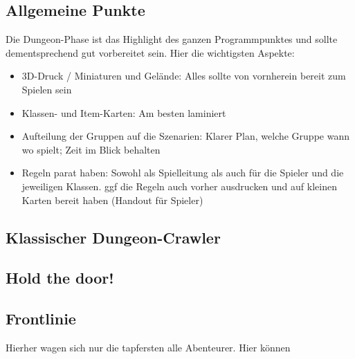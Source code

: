 \documentclass[letterpaper,twocolumn,openany,nodeprecatedcode]{dndbook}
\begin{document}
\subsection{Allgemeine Punkte}
Die Dungeon-Phase ist das Highlight des ganzen Programmpunktes und sollte dementsprechend gut
vorbereitet sein. Hier die wichtigsten Aspekte:

\begin{itemize}
    \item 3D-Druck / Miniaturen und Gelände: Alles sollte von vornherein bereit zum Spielen sein
    \item Klassen- und Item-Karten: Am besten laminiert
    \item Aufteilung der Gruppen auf die Szenarien: Klarer Plan, welche Gruppe wann wo spielt; Zeit im Blick behalten
    \item Regeln parat haben: Sowohl als Spielleitung als auch für die Spieler und die jeweiligen Klassen. ggf die Regeln auch vorher ausdrucken und auf kleinen Karten bereit haben (Handout für Spieler)
\end{itemize}

\subsection{Klassischer Dungeon-Crawler}

\subsection{\grqq Hold the door!\grqq}

\subsection{Frontlinie}
Hierher wagen sich nur die tapfersten alle Abenteurer. Hier können
\end{document}
